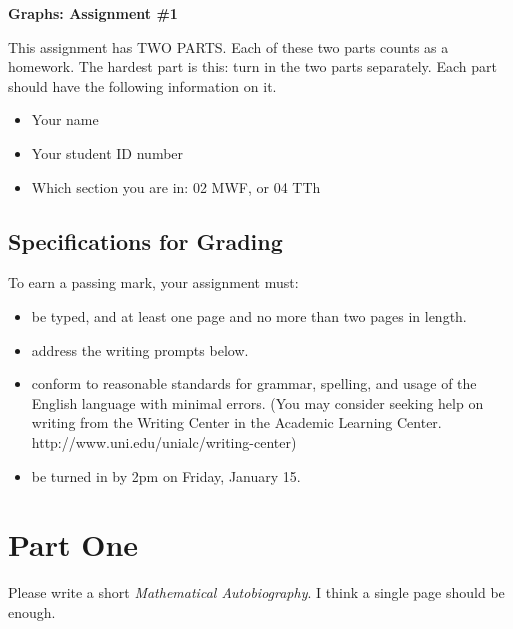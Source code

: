 \documentclass[12pt,letterpaper]{article}
\begin{document}
\setlength{\parskip}{1ex plus 0.5ex minus 0.2ex}
\setlength{\parindent}{0pt}

\pagestyle{fancy}
\lfoot{} 
\rfoot{} 

\begin{center}
{
\Large
\textbf{Graphs: Assignment \#1}
}
\end{center}

This assignment has TWO PARTS. Each of these two parts counts as a homework. The hardest part is this: turn in the two parts separately. Each part should have the following information on it.
\begin{itemize}
\item Your name
\item Your student ID number 
\item Which section you are in: 02 MWF, or 04 TTh
\end{itemize}


\subsection*{Specifications for Grading}

To earn a passing mark, your assignment must:
\begin{itemize}
\item be typed, and at least one page and no more than two pages in length.
\item address the writing prompts below.
\item conform to reasonable standards for grammar, spelling, and usage of the English language with minimal errors. (You may consider seeking help on writing from the Writing Center in the Academic Learning Center. http://www.uni.edu/unialc/writing-center)
\item be turned in by 2pm on Friday, January 15.
\end{itemize}


\section*{Part One}

Please write a short \emph{Mathematical Autobiography}.
I think a single page should be enough.\\
\end{document}
